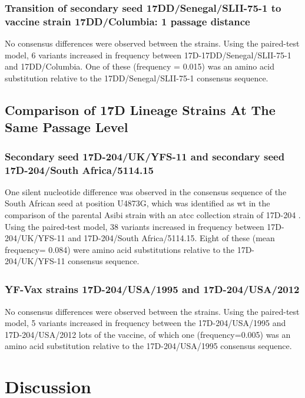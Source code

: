 	\subsubsection{Transition of secondary seed 17DD/Senegal/SLII-75-1 to vaccine strain 17DD/Columbia: 1 passage distance}
No consensus differences were observed between the strains. Using the paired-test model, 6 variants increased in frequency between 17D-17DD/Senegal/SLII-75-1 and 17DD/Columbia. One of these (frequency = 0.015) was an amino acid substitution relative to the 17DD/Senegal/SLII-75-1 consensus sequence.
	\subsection{Comparison of 17D Lineage Strains At The Same Passage Level}
	\subsubsection{Secondary seed 17D-204/UK/YFS-11 and secondary seed 17D-204/South Africa/5114.15}
One silent nucleotide difference was observed in the consensus sequence of the South African seed at position U4873G, which was identified as \gls{wt} in the comparison of the parental Asibi strain with an \gls{atcc} collection strain of 17D-204 \parencite{Hahn:1987tw}. Using the paired-test model, 38 variants increased in frequency between 17D-204/UK/YFS-11 and 17D-204/South Africa/5114.15. Eight of these (mean frequency= 0.084) were amino acid substitutions relative to the 17D-204/UK/YFS-11 consensus sequence.  
	\subsubsection{YF-Vax\textsuperscript{\textregistered} strains 17D-204/USA/1995 and 17D-204/USA/2012}
No consensus differences were observed between the strains. Using the paired-test model, 5 variants increased in frequency between the 17D-204/USA/1995 and 17D-204/USA/2012 lots of the vaccine, of which one (frequency=0.005) was an amino acid substitution relative to the 17D-204/USA/1995 consensus sequence. 

\section{Discussion}
